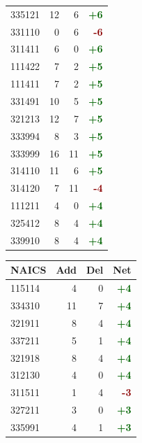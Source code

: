 \documentclass[11pt]{article}
\begin{document}
\begin{table}[H]
\begin{minipage}{0.48\textwidth}
\begin{tabular}{lrrr}
335121 & 12 & 6 & \textcolor{darkgreen}{\textbf{+6}} \\
331110 & 0 & 6 & \textcolor{darkred}{\textbf{-6}} \\
311411 & 6 & 0 & \textcolor{darkgreen}{\textbf{+6}} \\
111422 & 7 & 2 & \textcolor{darkgreen}{\textbf{+5}} \\
111411 & 7 & 2 & \textcolor{darkgreen}{\textbf{+5}} \\
331491 & 10 & 5 & \textcolor{darkgreen}{\textbf{+5}} \\
321213 & 12 & 7 & \textcolor{darkgreen}{\textbf{+5}} \\
333994 & 8 & 3 & \textcolor{darkgreen}{\textbf{+5}} \\
333999 & 16 & 11 & \textcolor{darkgreen}{\textbf{+5}} \\
314110 & 11 & 6 & \textcolor{darkgreen}{\textbf{+5}} \\
314120 & 7 & 11 & \textcolor{darkred}{\textbf{-4}} \\
111211 & 4 & 0 & \textcolor{darkgreen}{\textbf{+4}} \\
325412 & 8 & 4 & \textcolor{darkgreen}{\textbf{+4}} \\
339910 & 8 & 4 & \textcolor{darkgreen}{\textbf{+4}} \\
\bottomrule
\end{tabular}
\end{minipage}
\hfill
\begin{minipage}{0.48\textwidth}
\centering
{}
\begin{tabular}{lrrr}
\toprule
\textbf{NAICS} & \textbf{Add} & \textbf{Del} & \textbf{Net} \\
\midrule
115114 & 4 & 0 & \textcolor{darkgreen}{\textbf{+4}} \\
334310 & 11 & 7 & \textcolor{darkgreen}{\textbf{+4}} \\
321911 & 8 & 4 & \textcolor{darkgreen}{\textbf{+4}} \\
337211 & 5 & 1 & \textcolor{darkgreen}{\textbf{+4}} \\
321918 & 8 & 4 & \textcolor{darkgreen}{\textbf{+4}} \\
312130 & 4 & 0 & \textcolor{darkgreen}{\textbf{+4}} \\
311511 & 1 & 4 & \textcolor{darkred}{\textbf{-3}} \\
327211 & 3 & 0 & \textcolor{darkgreen}{\textbf{+3}} \\
335991 & 4 & 1 & \textcolor{darkgreen}{\textbf{+3}} \\

\end{tabular}
\end{minipage}
\end{table}
\end{document}
